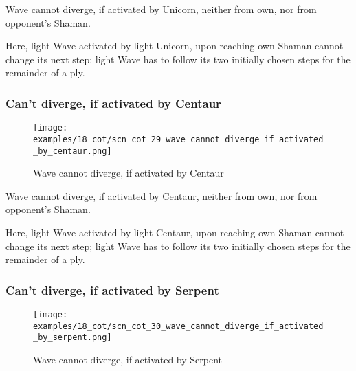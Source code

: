 \vspace*{-0.5\baselineskip}
Wave cannot diverge, if
\hyperref[fig:scn_mv_22_wave_activation_by_unicorn_first_step]{activated by Unicorn},
neither from own, nor from opponent's Shaman.

Here, light Wave activated by light Unicorn, upon reaching own Shaman cannot change
its next step; light Wave has to follow its two initially chosen steps for the
remainder of a ply.

\clearpage %

\subsubsection*{Can't diverge, if activated by Centaur}
\label{sec:Conquest of Tlalocan/Divergence/Can't diverge, if activated by Centaur}

\vspace*{-1.4\baselineskip}
\noindent
\begin{figure}[!h]
\texttt{[image: examples/18\_cot/scn\_cot\_29\_wave\_cannot\_diverge\_if\_activated\_by\_centaur.png]}
\vspace*{-1.3\baselineskip}
\caption{Wave cannot diverge, if activated by Centaur}
\label{fig:scn_cot_29_wave_cannot_diverge_if_activated_by_centaur}
\end{figure}

\vspace*{-0.5\baselineskip}
Wave cannot diverge, if
\hyperref[fig:scn_hd_07_wave_activation_by_centaur_first_step]{activated by Centaur},
neither from own, nor from opponent's Shaman.

Here, light Wave activated by light Centaur, upon reaching own Shaman cannot change
its next step; light Wave has to follow its two initially chosen steps for the
remainder of a ply.

\clearpage %

\subsubsection*{Can't diverge, if activated by Serpent}
\label{sec:Conquest of Tlalocan/Divergence/Can't diverge, if activated by Serpent}

\vspace*{-1.4\baselineskip}
\noindent
\begin{figure}[!h]
\texttt{[image: examples/18\_cot/scn\_cot\_30\_wave\_cannot\_diverge\_if\_activated\_by\_serpent.png]}
\vspace*{-1.3\baselineskip}
\caption{Wave cannot diverge, if activated by Serpent}
\label{fig:scn_cot_30_wave_cannot_diverge_if_activated_by_serpent}
\end{figure}

